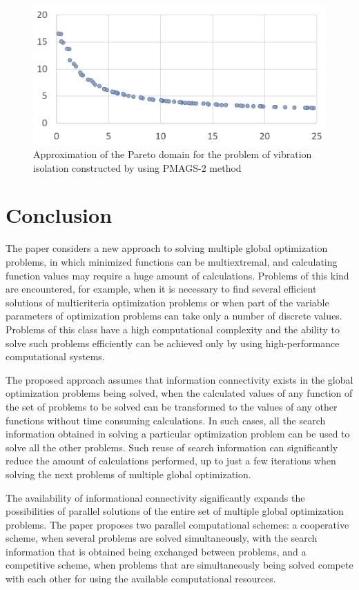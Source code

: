 \documentclass[review]{elsarticle}
\begin{document}
\begin{figure}
  \centering
  \includegraphics[width=0.7\linewidth]{fig6}
  \caption{Approximation of the Pareto domain for the problem of vibration isolation constructed by using PMAGS-2 method}
  \label{fig:6}
\end{figure}


\section{Conclusion}\label{sec:6}

The paper considers a new approach to solving multiple global optimization problems, in which minimized functions can be multiextremal, and calculating function values may require a huge amount of calculations. Problems of this kind are encountered, for example, when it is necessary to find several efficient solutions of multicriteria optimization problems or when part of the variable parameters of optimization problems can take only a number of discrete values. Problems of this class have a high computational complexity and the ability to solve such problems efficiently can be achieved only by using high-performance computational systems.

The proposed approach assumes that information connectivity exists in the global optimization problems being solved, when the calculated values of any function of the set of problems to be solved can be transformed to the values of any other functions without time consuming calculations. In such cases, all the search information obtained in solving a particular optimization problem can be used to solve all the other problems. Such reuse of search information can significantly reduce the amount of calculations performed, up to just a few iterations when solving the next problems of multiple global optimization.

The availability of informational connectivity significantly expands the possibilities of parallel solutions of the entire set of multiple global optimization problems. The paper proposes two parallel computational schemes: a cooperative scheme, when several problems are solved simultaneously, with the search information that is obtained being exchanged between problems, and a competitive scheme, when problems that are simultaneously being solved compete with each other for using the available computational resources.
\end{document}
